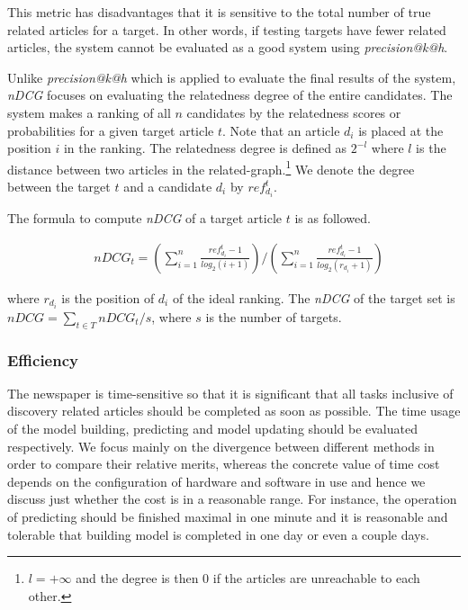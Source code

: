 This metric has disadvantages that it is sensitive to the total number of true related articles for a target. In other words, if testing targets have fewer related articles, the system cannot be evaluated as a good system using \textit{precision@k@h}. 

Unlike \textit{precision@k@h} which is applied to evaluate the final results of the system, \textit{nDCG} focuses on evaluating the relatedness degree of the entire candidates. The system makes a ranking of all $n$ candidates by the relatedness scores or probabilities for a given target article $t$. Note that an article $d_i$ is placed at the position $i$ in the ranking. The relatedness degree is defined as $2^{-l}$ where $l$ is the distance between two articles in the related-graph.\footnote{$l=+\infty$ and the degree is then $0$ if the articles are unreachable to each other.} We denote the degree between the target $t$ and a candidate $d_i$ by $ref_{d_i}^t$.

The formula to compute \textit{nDCG} of a target article $t$ is as followed. 

\begin{align}
   & nDCG_t = (\sum_{i=1}^n\frac{ref_{d_i}^t-1}{log_2(i+1)})/(\sum_{i=1}^n\frac{ref_{d_i}^t-1}{log_2(r_{d_i}+1)})
\end{align}

where $r_{d_i}$ is the position of $d_i$ of the ideal ranking. The \textit{nDCG} of the target set is $nDCG = \sum_{t \in T}nDCG_t/s$, where $s$ is the number of targets.

\subsubsection{Efficiency}

The newspaper is time-sensitive so that it is significant that all tasks inclusive of discovery related articles should be completed as soon as possible. The time usage of the model building, predicting and model updating should be evaluated respectively. We focus mainly on the divergence between different methods in order to compare their relative merits, whereas the concrete value of time cost depends on the configuration of hardware and software in use and hence we discuss just whether the cost is in a reasonable range. For instance, the operation of predicting should be finished maximal in one minute and it is reasonable and tolerable that building model is completed in one day or even a couple days. 
